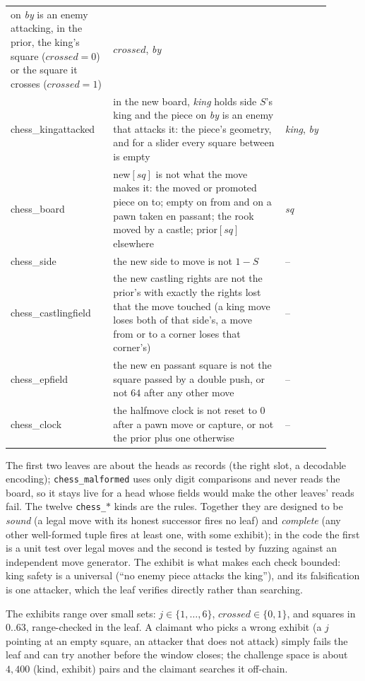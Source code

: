 \documentclass[11pt]{article}
\begin{document}
\begin{center}
\begin{tabular}{@{}>{\ttfamily}p{0.28\linewidth}p{0.49\linewidth}p{0.13\linewidth}@{}}
  on \emph{by} is an enemy attacking, in the prior, the king's square
  ($\mathit{crossed} = 0$) or the square it crosses ($\mathit{crossed} =
  1$) & $\mathit{crossed}$, \emph{by} \\
chess\_kingattacked & in the new board, \emph{king} holds side $S$'s
  king and the piece on \emph{by} is an enemy that attacks it: the
  piece's geometry, and for a slider every square between is empty &
  \emph{king}, \emph{by} \\
chess\_board & new$[\mathit{sq}]$ is not what the move makes it: the
  moved or promoted piece on to; empty on from and on a pawn taken en
  passant; the rook moved by a castle; prior$[\mathit{sq}]$ elsewhere
  & \emph{sq} \\
chess\_side & the new side to move is not $1 - S$ & -- \\
chess\_castlingfield & the new castling rights are not the prior's
  with exactly the rights lost that the move touched (a king move
  loses both of that side's, a move from or to a corner loses that
  corner's) & -- \\
chess\_epfield & the new en passant square is not the square passed by
  a double push, or not $64$ after any other move & -- \\
chess\_clock & the halfmove clock is not reset to $0$ after a pawn
  move or capture, or not the prior plus one otherwise & -- \\
\bottomrule
\end{tabular}
\end{center}
The first two leaves are about the heads as records (the right slot,
a decodable encoding); \texttt{chess\_malformed} uses only digit
comparisons and never reads the board, so it stays live for a head
whose fields would make the other leaves' reads fail. The twelve
\texttt{chess\_}$\ast$ kinds are the rules. Together they are designed
to be \emph{sound} (a legal move with its honest successor fires no
leaf) and \emph{complete} (any other well-formed tuple fires at least
one, with some exhibit); in the code the first is a unit test over
legal moves and the second is tested by fuzzing against an independent
move generator. The exhibit is what makes each check bounded: king
safety is a universal (``no enemy piece attacks the king''), and its
falsification is one attacker, which the leaf verifies directly rather
than searching.

The exhibits range over small sets: $j \in \{1,\dots,6\}$,
$\mathit{crossed} \in \{0,1\}$, and squares in $0..63$, range-checked
in the leaf. A claimant who picks a wrong exhibit (a $j$ pointing at
an empty square, an attacker that does not attack) simply fails the
leaf and can try another before the window closes; the challenge space
is about $4{,}400$ (kind, exhibit) pairs and the claimant searches it
off-chain.
\end{document}
